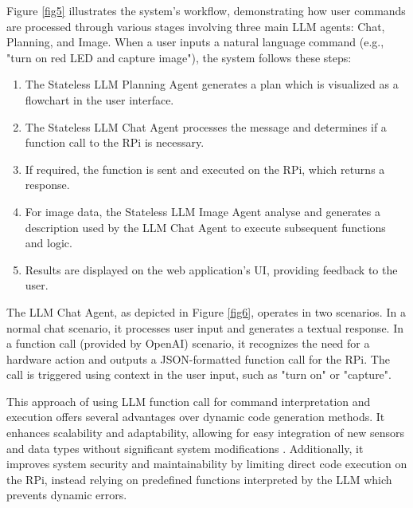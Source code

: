 \documentclass[lettersize,journal]{IEEEtran}
\begin{document}
Figure \ref{fig5} illustrates the system's workflow, demonstrating how user commands are processed through various stages involving three main LLM agents: Chat, Planning, and Image. When a user inputs a natural language command (e.g., "turn on red LED and capture image"), the system follows these steps:

\begin{enumerate}
    \item The Stateless LLM Planning Agent generates a plan which is visualized as a flowchart in the user interface.
    \item The Stateless LLM Chat Agent processes the message and determines if a function call to the RPi is necessary.
    \item If required, the function is sent and executed on the RPi, which returns a response.
    \item For image data, the Stateless LLM Image Agent analyse and generates a description used by the LLM Chat Agent to execute subsequent functions and logic.
    \item Results are displayed on the web application's UI, providing feedback to the user.
\end{enumerate}

The LLM Chat Agent, as depicted in Figure \ref{fig6}, operates in two scenarios. In a normal chat scenario, it processes user input and generates a textual response. In a function call (provided by OpenAI) scenario, it recognizes the need for a hardware action and outputs a JSON-formatted function call for the RPi. The call is triggered using context in the user input, such as "turn on" or "capture".



This approach of using LLM function call for command interpretation and execution offers several advantages over dynamic code generation methods. It enhances scalability and adaptability, allowing for easy integration of new sensors and data types without significant system modifications \cite{yang2023autogptonlinedecisionmaking}. Additionally, it improves system security and maintainability by limiting direct code execution on the RPi, instead relying on predefined functions interpreted by the LLM which prevents dynamic errors.
\end{document}
